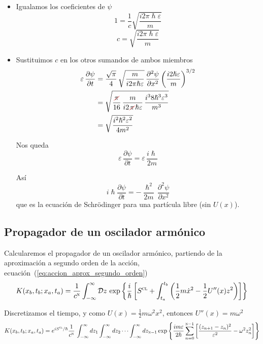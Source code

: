 \begin{itemize}
\item Igualamos los coeficientes de $\psi$
\[
  1 = \dfrac{1}{c} \sqrt{\dfrac{i2\pi\hslash\varepsilon}{m}}
\]
\begin{equation}\label{eq:c}
  c = \sqrt{\dfrac{i2\pi\hslash\varepsilon}{m}}
\end{equation}

\item Sustituimos $c$ en los otros sumandos de ambos miembros
  \begin{align*}
    \varepsilon\,\dfrac{\partial\psi}{\partial t}
    &=
      \dfrac{\sqrt{\pi}}{4}\,\sqrt{\dfrac{m}{i2\pi\hslash\varepsilon}}\,\dfrac{\partial^2\psi}{\partial x^2} \left(\dfrac{i2\hslash\varepsilon}{m}\right)^{3/2}\\
    &=
      \sqrt{\dfrac{\cancelout{\pi}}{16}\,\dfrac{m}{i2\cancelout{\pi}\hslash\varepsilon}\,\dfrac{i^38\hslash^3\varepsilon^3}{m^3}}\\
  &=
    \sqrt{\dfrac{i^2\hslash^2\varepsilon^2}{4m^2}}
  \end{align*}

  Nos queda
  \[
    \varepsilon\,\dfrac{\partial\psi}{\partial t}
    =
    \varepsilon\,\dfrac{i\hslash}{2m} 
  \]

  Así
  \[
    i\hslash\dfrac{\partial\psi}{\partial t}
    =
    -\dfrac{\hslash^2}{2m}\,\dfrac{\partial^2\psi}{\partial x^2}
  \]
  que es la ecuación de Schrödinger para una partícula libre (sin $U(x)$).
\end{itemize}

\subsection{Propagador de un oscilador armónico}
Calcularemos el propagador de un oscilador armónico, partiendo de la
aproximación a segundo orden de la acción,
ecuación~(\ref{eq:accion_aprox_segundo_orden})
\[
  K(x_b,t_b;x_a,t_a)
  =
  \dfrac{1}{c^{\textsc{n}}}
  \int_{-\infty}^{\infty} \mathcal{D}z\,
  \exp\left\{\dfrac{i}{\hslash}
    \left[S^{\textsc{cl}}+\int_{t_a}^{t_b}\left(\dfrac{1}{2}m\dot{x}^2-\dfrac{1}{2}U''(x)z^2\right)\right]\right\}
\]

Discretizamos el tiempo, y como $U(x)=\frac{1}{2}m\omega^2x^2$,
entonces $U''(x) = m\omega^2$
{\small
\[
 K(x_b,t_b;x_a,t_a) =
  e^{iS^{\textsc{cl}}/\hslash}
  \dfrac{1}{c^{\textsc{n}}}\,
  \int_{-\infty}^{\infty}dz_1
  \int_{-\infty}^{\infty}dz_2
  \cdots
  \int_{-\infty}^{\infty}dz_{\textsc{n}-1}
  \exp\left\{\frac{im\varepsilon}{2\hslash}
  \sum_{n=0}^{\textsc{n}-1}
  \left[\dfrac{(z_{n+1}-z_n)^2}{\varepsilon^2}-\omega^2z_n^2
  \right]\right\}
\]
}

